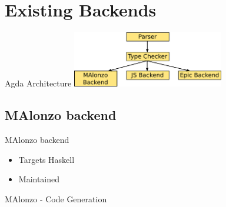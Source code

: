 \section{Existing Backends}

\begin{frame}[fragile]{Agda Architecture}
\includegraphics[width=250px]{agda-arch.png}
\end{frame}

\subsection{MAlonzo backend}
\begin{frame}{MAlonzo backend}
\begin{itemize}
\item Targets Haskell
\item Maintained
\end{itemize}
\end{frame}

\begin{frame}[fragile]{MAlonzo - Code Generation}
\begin{code}%
\> \AgdaSymbol{:}  \AgdaSymbol{\{} \AgdaSymbol{\}}  \AgdaSymbol{(}  \AgdaSymbol{)}\<%
\\
\>[2]\<[4]%
\>[4]     \<%
\\
\>  \AgdaInductiveConstructor{[]} \AgdaSymbol{=} \<%
\\
\>  \AgdaSymbol{(} \AgdaInductiveConstructor{::} \AgdaSymbol{)} \AgdaSymbol{=}  \AgdaFunction{++} \AgdaSymbol{((} \AgdaSymbol{)}\<%
\\
\>[2]\<[4]%
\>[4]\AgdaFunction{++} \AgdaSymbol{(}  \AgdaSymbol{))}\<%
\end{code}
\end{frame}

